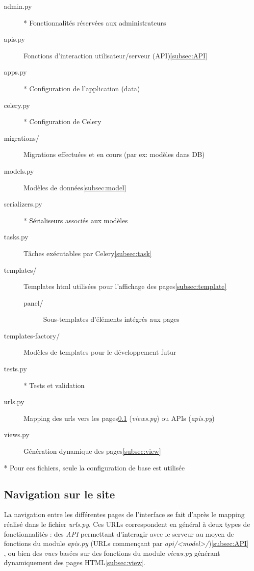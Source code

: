 \documentclass[a4paper]{report}
\begin{document}
\begin{description}
\item[admin.py]* Fonctionnalités réservées aux administrateurs
\item[apis.py] Fonctions d'interaction utilisateur/serveur (API)\ref{subsec:API}
\item[apps.py]* Configuration de l'application (data)
\item[celery.py]* Configuration de Celery
\item[migrations/] Migrations effectuées et en cours (par ex: modèles dans DB)
\item[models.py] Modèles de données\ref{subsec:model}
\item[serializers.py]* Sérialiseurs associés aux modèles
\item[tasks.py] Tâches exécutables par Celery\ref{subsec:task}
\item[templates/] Templates html utilisées pour l'affichage des pages\ref{subsec:template}
\begin{description}
	\item[panel/] Sous-templates d'éléments intégrés aux pages
\end{description}
\item[templates-factory/] Modèles de templates pour le développement futur
\item[tests.py]* Tests et validation
\item[urls.py] Mapping des urls vers les pages\ref{subsec:url} (\emph{views.py}) ou APIs (\emph{apis.py})
\item[views.py] Génération dynamique des pages\ref{subsec:view}
\end{description}
 
* Pour ces fichiers, seule la configuration de base est utilisée
 
\subsection{Navigation sur le site}
\label{subsec:url}
La navigation entre les différentes pages de l'interface se fait d'après le mapping réalisé dans le fichier \emph{urls.py}. Ces URLs correspondent en général à deux types de fonctionnalités : des \emph{API} permettant d'interagir avec le serveur au moyen de fonctions du module \emph{apis.py} (URLs commençant par \emph{api/<model>/})\ref{subsec:API} , ou bien des \emph{vues} basées sur des fonctions du module \emph{views.py} générant dynamiquement des pages HTML\ref{subsec:view}.
\end{document}
